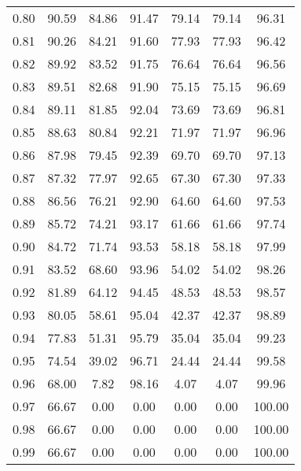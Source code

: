 \begin{tabular}{|c|c|c|c|c|c|c|}
      0.80 &     90.59 &     84.86 &      91.47 &   79.14 &      79.14 &         96.31 \\
      0.81 &     90.26 &     84.21 &      91.60 &   77.93 &      77.93 &         96.42 \\
      0.82 &     89.92 &     83.52 &      91.75 &   76.64 &      76.64 &         96.56 \\
      0.83 &     89.51 &     82.68 &      91.90 &   75.15 &      75.15 &         96.69 \\
      0.84 &     89.11 &     81.85 &      92.04 &   73.69 &      73.69 &         96.81 \\
      0.85 &     88.63 &     80.84 &      92.21 &   71.97 &      71.97 &         96.96 \\
      0.86 &     87.98 &     79.45 &      92.39 &   69.70 &      69.70 &         97.13 \\
      0.87 &     87.32 &     77.97 &      92.65 &   67.30 &      67.30 &         97.33 \\
      0.88 &     86.56 &     76.21 &      92.90 &   64.60 &      64.60 &         97.53 \\
      0.89 &     85.72 &     74.21 &      93.17 &   61.66 &      61.66 &         97.74 \\
      0.90 &     84.72 &     71.74 &      93.53 &   58.18 &      58.18 &         97.99 \\
      0.91 &     83.52 &     68.60 &      93.96 &   54.02 &      54.02 &         98.26 \\
      0.92 &     81.89 &     64.12 &      94.45 &   48.53 &      48.53 &         98.57 \\
      0.93 &     80.05 &     58.61 &      95.04 &   42.37 &      42.37 &         98.89 \\
      0.94 &     77.83 &     51.31 &      95.79 &   35.04 &      35.04 &         99.23 \\
      0.95 &     74.54 &     39.02 &      96.71 &   24.44 &      24.44 &         99.58 \\
      0.96 &     68.00 &      7.82 &      98.16 &    4.07 &       4.07 &         99.96 \\
      0.97 &     66.67 &      0.00 &       0.00 &    0.00 &       0.00 &        100.00 \\
      0.98 &     66.67 &      0.00 &       0.00 &    0.00 &       0.00 &        100.00 \\
      0.99 &     66.67 &      0.00 &       0.00 &    0.00 &       0.00 &        100.00 \\
\bottomrule
\end{tabular}

